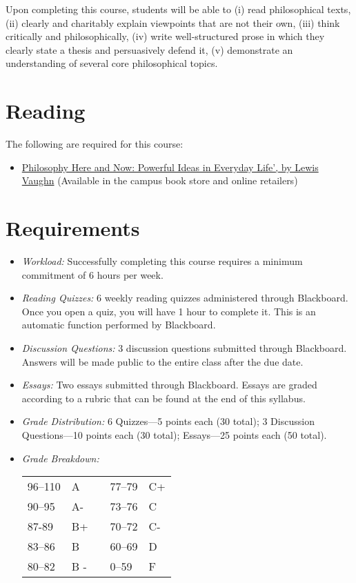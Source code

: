 \documentclass[11pt,article,oneside]{memoir}
\begin{document}
Upon completing this course, students will be able to (i) read
philosophical texts, (ii) clearly and charitably explain viewpoints that
are not their own, (iii) think critically and philosophically, (iv)
write well-structured prose in which they clearly state a thesis and
persuasively defend it, (v) demonstrate an understanding of several core
philosophical topics.

\section{Reading}

The following are required for this course:

\begin{itemize}
\item
  \href{http://www.amazon.com/Philosophy-Here-Now-Powerful-Everyday/dp/0199765227}{Philosophy
  Here and Now: Powerful Ideas in Everyday Life', by Lewis Vaughn}
  (Available in the campus book store and online retailers)
\end{itemize}

\section{Requirements}

\begin{itemize}
\item \textit{Workload:} Successfully completing this course requires a minimum commitment of 6 hours per week. 

\item \textit{Reading Quizzes:}  6 weekly reading quizzes administered through Blackboard. Once you open a quiz, you will have
1 hour to complete it. This is an automatic function performed
by Blackboard.
\item \textit{Discussion Questions:} 3 discussion questions submitted through Blackboard. Answers will be made public to the entire class after the due date. 

\item \textit{Essays:} Two essays submitted through Blackboard. Essays are graded according to a rubric that can be found at the end of this syllabus. 

\item \textit{Grade Distribution:} 6 Quizzes---5 points each (30 total); 3 Discussion Questions---10 points each (30 total); Essays---25 points each (50 total).

\item \textit{Grade Breakdown:}

 \begin{tabular}{ | l | l | p{2cm} | l | l | }
    \hline 
96--110 & A  & &  77--79 &  C+ \\  
90--95 & A- & &  73--76 & C \\
87-89 & B+ &  &  70--72 & C- \\ 
83--86 & B  & &  60--69 & D\\
80--82 & B - & & 0--59 & F\\ \hline
    \end{tabular}


\end{itemize}
\end{document}
